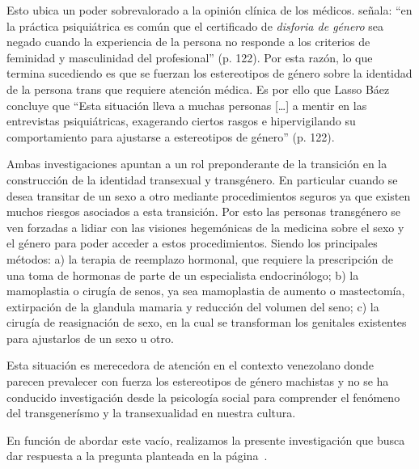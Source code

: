 Esto ubica un poder sobrevalorado a la opinión clínica de los médicos.
\textcite{LassoBaez2014} señala: “en la práctica psiquiátrica es común que el
certificado de \emph{disforia de género} sea negado cuando la experiencia de la
persona no responde a los criterios de feminidad y masculinidad del profesional”
(p. 122). Por esta razón, lo que termina sucediendo es que se fuerzan los
estereotipos de género sobre la identidad de la persona trans que requiere
atención médica. Es por ello que Lasso Báez concluye que “Esta situación lleva a
muchas personas […] a mentir en las entrevistas psiquiátricas, exagerando
ciertos rasgos e hipervigilando su comportamiento para ajustarse a estereotipos
de género” (p. 122).

Ambas investigaciones apuntan a un rol preponderante de la
transición en la construcción de la identidad transexual y transgénero.
En particular cuando se desea transitar de un sexo a otro mediante
procedimientos seguros ya que existen muchos riesgos asociados a esta
transición. Por esto las personas transgénero se ven forzadas a lidiar con las
visiones hegemónicas de la medicina sobre el sexo y el género para poder acceder
a estos procedimientos. Siendo los principales métodos: a) la terapia de
reemplazo hormonal, que requiere la prescripción de una toma de hormonas de
parte de un especialista endocrinólogo; b) la mamoplastia o cirugía de senos, ya
sea mamoplastia de aumento o mastectomía, extirpación de la glandula mamaria y
reducción del volumen del seno; c) la cirugía de reasignación de sexo, en la
cual se transforman los genitales existentes para ajustarlos de un sexo u otro.

Esta situación es merecedora de atención en el contexto venezolano donde parecen
prevalecer con fuerza los estereotipos de género machistas y no se ha conducido
investigación desde la psicología social para comprender el fenómeno del
transgenerísmo y la transexualidad en nuestra cultura.

En función de abordar este vacío, realizamos la presente investigación que busca
dar respuesta a la pregunta planteada en la página~\pageref{preguntas}.


